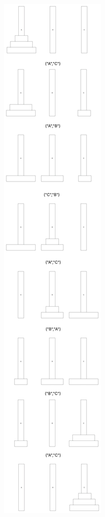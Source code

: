 	\begin{figure}
    		\centerline{\includegraphics[scale=.3]{assets/Hanoi.jpeg}}       
	\end{figure}


